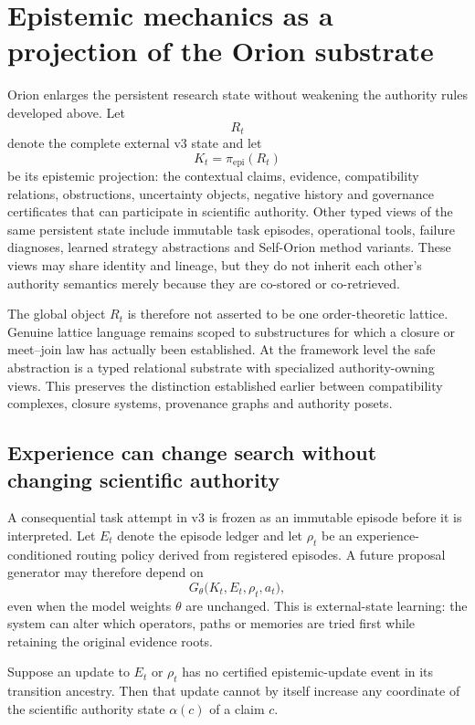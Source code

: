 \section{Epistemic mechanics as a projection of the Orion substrate}
\label{sec:v3-epistemic-projection}

Orion enlarges the persistent research state without weakening the authority rules developed above. Let
\[
R_t
\]
denote the complete external v3 state and let
\[
K_t=\pi_{\mathrm{epi}}(R_t)
\]
be its epistemic projection: the contextual claims, evidence, compatibility relations, obstructions, uncertainty objects, negative history and governance certificates that can participate in scientific authority. Other typed views of the same persistent state include immutable task episodes, operational tools, failure diagnoses, learned strategy abstractions and Self-Orion method variants. These views may share identity and lineage, but they do not inherit each other's authority semantics merely because they are co-stored or co-retrieved.

The global object $R_t$ is therefore not asserted to be one order-theoretic lattice. Genuine lattice language remains scoped to substructures for which a closure or meet--join law has actually been established. At the framework level the safe abstraction is a typed relational substrate with specialized authority-owning views. This preserves the distinction established earlier between compatibility complexes, closure systems, provenance graphs and authority posets.

\subsection{Experience can change search without changing scientific authority}

A consequential task attempt in v3 is frozen as an immutable episode before it is interpreted. Let $E_t$ denote the episode ledger and let $\rho_t$ be an experience-conditioned routing policy derived from registered episodes. A future proposal generator may therefore depend on
\[
G_\theta\bigl(K_t,E_t,\rho_t,a_t\bigr),
\]
even when the model weights $\theta$ are unchanged. This is external-state learning: the system can alter which operators, paths or memories are tried first while retaining the original evidence roots.

\begin{proposition}
Suppose an update to $E_t$ or $\rho_t$ has no certified epistemic-update event in its transition ancestry. Then that update cannot by itself increase any coordinate of the scientific authority state $\alpha(c)$ of a claim $c$.
\end{proposition}

